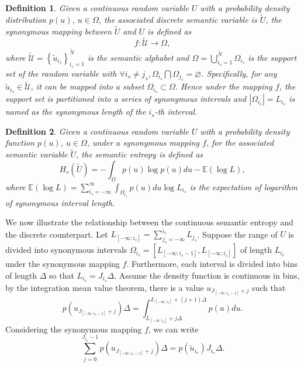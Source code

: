 \documentclass[12pt, draftclsnofoot,onecolumn]{IEEEtran}
\newtheorem{definition}{\bf{Definition}}
\begin{document}
\begin{definition}
Given a continuous random variable $U$ with a probability density distribution $p(u)$, $u\in \Omega$, the associated discrete semantic variable is $\tilde{U}$, the synonymous mapping between $\tilde{U}$ and $U$ is defined as
\begin{equation}
f: \tilde{\mathcal{U}}\to \Omega,
\end{equation}
where $\tilde{\mathcal{U}}=\left\{\tilde{u}_{i_s}\right\}_{i_s=1}^{\tilde{N}}$ is the semantic alphabet and $\Omega=\bigcup_{i_s=1}^{\tilde{N}}\Omega_{i_s}$ is the support set of the random variable with $\forall i_s\neq j_s, \Omega_{i_s}\bigcap \Omega_{j_s}=\varnothing$.
Specifically, for any $\tilde{u}_{i_s} \in \tilde{\mathcal{U}}$, it can be mapped into a subset $\Omega_{i_s}\subset \Omega$. Hence under the mapping $f$, the support set is partitioned into a series of synonymous intervals and $\left|\Omega_{i_s}\right|=L_{i_s}$ is named as the synonymous length of the $i_s$-th interval. %
\end{definition}

\begin{definition}
Given a continuous random variable $U$ with a probability density function $p(u)$, $u\in \Omega$, under a synonymous mapping $f$, for the associated semantic variable $\tilde{U}$, the semantic entropy is defined as
\begin{equation}\label{conti_semantic_entropy}
H_s(\tilde{U})=-\int_{\Omega} p(u)\log p(u)du-\mathbb{E}(\log L),
\end{equation}
where $\mathbb{E}(\log L)=\sum_{i_s=-\infty}^{\infty}\int_{\Omega_{i_s}}p(u)du \log L_{i_s}$ is the expectation of logarithm of synonymous interval length.
\end{definition}

We now illustrate the relationship between the continuous semantic entropy and the discrete counterpart. Let $L_{[-\infty:i_s]}=\sum_{j_s=-\infty}^{i_s}L_{j_s}$. Suppose the range of $U$ is divided into synonymous intervals $\Omega_{i_s}=\left[L_{[-\infty:i_s-1]},L_{[-\infty:i_s]}\right]$ of length $L_{i_s}$ under the synonymous mapping $f$. Furthermore, each interval is divided into bins of length $\Delta$ so that $L_{i_s}=J_{i_s}\Delta$. Assume the density function is continuous in bins, by the integration mean value theorem, there is a value $u_{J_{[-\infty:i_s-1]}+j}$ such that
\begin{equation}
p(u_{J_{[-\infty:i_s-1]}+j})\Delta=\int_{L_{[-\infty:i_s]}+j\Delta}^{L_{[-\infty:i_s]}+(j+1)\Delta} p(u)du.
\end{equation}
Considering the synonymous mapping $f$, we can write
\begin{equation}
\sum_{j=0}^{J_{i_s}-1} p(u_{J_{[-\infty:i_s-1]}+j})\Delta =p(\tilde{u}_{i_s})J_{i_s}\Delta.
\end{equation}
\end{document}
